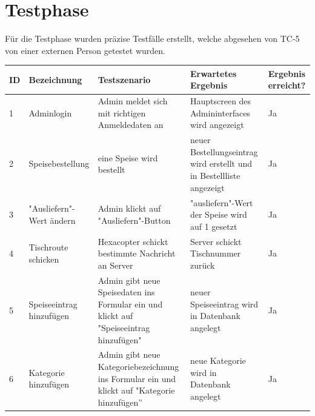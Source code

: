 \section{Testphase}
Für die Testphase wurden präzise Testfälle erstellt, welche abgesehen von TC-5 von einer externen Person getestet wurden.

\begin{table}[H]
\centering
\begin{tabular}{|p{0.5cm}|p{3cm}|p{4.5cm}|p{4cm}|p{2cm}|}
\hline \textbf{ID} & \textbf{Bezeichnung} & \textbf{Testszenario} & \textbf{Erwartetes Ergebnis} & \textbf{Ergebnis erreicht?} \\\hline
\hline 1 & Adminlogin & Admin meldet sich mit \newline richtigen Anmeldedaten \newline an & Hauptscreen des \newline Admininterfaces wird \newline angezeigt & Ja \\\hline
\hline 2 & Speisebestellung & eine Speise wird bestellt & neuer Bestellungseintrag wird erstellt und in \newline Bestellliste angezeigt & Ja \\\hline
\hline 3 & "Ausliefern"-Wert \newline ändern & Admin klickt auf "Ausliefern"-Button & "ausliefern"-Wert der Speise wird auf 1 gesetzt & Ja \\\hline
\hline 4 & Tischroute \newline schicken & Hexacopter schickt \newline bestimmte Nachricht an Server & Server schickt \newline Tischnummer zurück & Ja \\\hline
\hline 5 & Speiseeintrag \newline hinzufügen & Admin gibt neue \newline Speisedaten ins Formular ein und klickt auf \newline "Speiseeintrag hinzufügen" & neuer Speiseeintrag wird in Datenbank angelegt & Ja \\\hline
\hline 6 & Kategorie \newline hinzufügen & Admin gibt neue \newline Kategoriebezeichnung ins \newline Formular ein und klickt auf \newline "Kategorie hinzufügen” & neue Kategorie wird in Datenbank angelegt & Ja \\\hline

\end{tabular}
\end{table}
